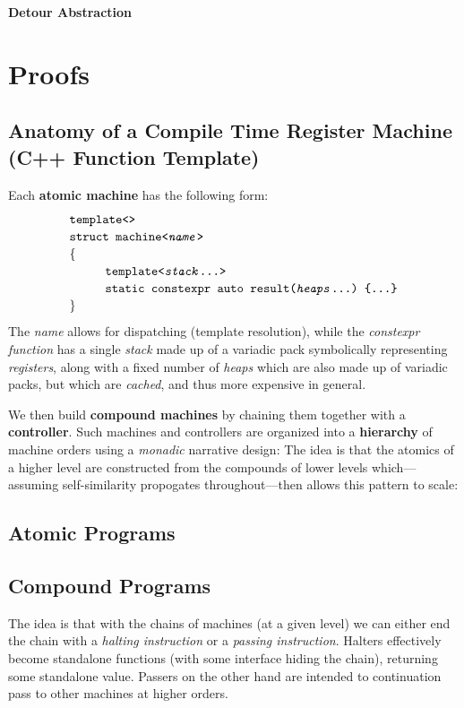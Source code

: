 \documentclass[twoside]{article}
\newcommand{\strong}[1]{{\bfseries #1}}
\newcommand{\tab}[1][1.125cm]{\hspace{#1}}
\begin{document}
\strong{Detour Abstraction}

\section*{Proofs}

\subsection*{Anatomy of a Compile Time Register Machine (C++ Function Template)}

\noindent Each \strong{atomic machine} has the following form:
$$ \def\arraystretch{1.15}
\tab[0cm] \begin{array}{l}
\texttt{template<>}									\\
\texttt{struct machine<\emph{name}>}							\\
\{											\\
\tab[1cm]\texttt{template<\emph{stack}\ldots>}						\\
\tab[1cm]\texttt{static constexpr auto result(\emph{heaps}\ldots)\ \{\ldots\}}		\\
\}
\end{array} $$
The \emph{name} allows for dispatching (template resolution), while the \emph{constexpr function}
has a single \emph{stack} made up of a variadic pack symbolically representing \emph{registers},
along with a fixed number of \emph{heaps} which are also made up of variadic packs, but which
are \emph{cached}, and thus more expensive in general.

We then build \strong{compound machines} by chaining them together with a \strong{controller}.
Such machines and controllers are organized into a \strong{hierarchy} of machine orders using
a \emph{monadic} narrative design: The idea is that the atomics of a higher level are constructed
from the compounds of lower levels which---assuming self-similarity propogates throughout---then
allows this pattern to scale:

\subsection*{Atomic Programs}

\subsection*{Compound Programs}

The idea is that with the chains of machines (at a given level) we can either end the chain with
a \emph{halting instruction} or a \emph{passing instruction}. Halters effectively become standalone functions
(with some interface hiding the chain), returning some standalone value. Passers on the other hand are intended
to continuation pass to other machines at higher orders.
\end{document}
